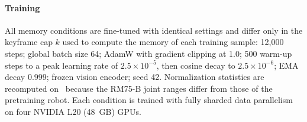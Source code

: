 \paragraph{Training} All memory conditions are fine-tuned with identical settings and differ only in the keyframe cap $k$ used to compute the memory of each training sample: 12{,}000 steps; global batch size 64; AdamW with gradient clipping at 1.0; 500 warm-up steps to a peak learning rate of $2.5\times10^{-5}$, then cosine decay to $2.5\times10^{-6}$; EMA decay 0.999; frozen vision encoder; seed 42. Normalization statistics are recomputed on \bench\ because the RM75-B joint ranges differ from those of the pretraining robot. Each condition is trained with fully sharded data parallelism on four NVIDIA L20 (48~GB) GPUs.
